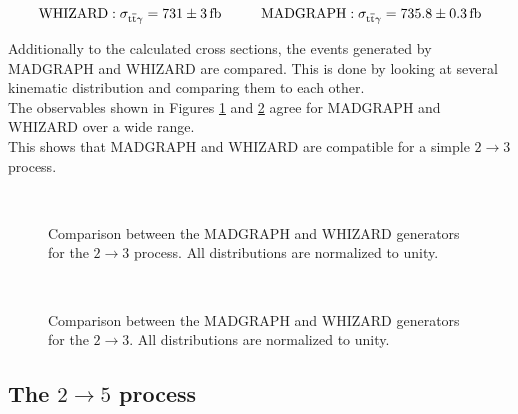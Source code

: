 \begin{equation}
\mathrm{WHIZARD: }\; \sigma_{\ttgamma} = \SI{731 \pm 3}{\femto \barn} \hspace{1.cm} \mathrm{MADGRAPH: }\;  \sigma_{\ttgamma} = \SI{735.8 \pm 0.3}{\femto \barn}
\label{eq_simu_2to3_cross}
\end{equation}

Additionally to the calculated cross sections, the events generated by MADGRAPH and WHIZARD are compared. This is done by looking  at several kinematic distribution and comparing them to each other. \\
The observables shown in Figures \ref{fig_simu_comp_2to3_1} and \ref{fig_simu_comp_2to3_2} agree for MADGRAPH and WHIZARD over a wide range.\\
This shows that MADGRAPH and WHIZARD are compatible for a simple $2 \to 3$ process.

\begin{figure}
\centering
  \\
  \caption{Comparison between the MADGRAPH and WHIZARD generators for the $2 \to 3$ process. All distributions are normalized to unity.}
  \label{fig_simu_comp_2to3_1}
\end{figure}

\begin{figure}
\centering
  \\
  \caption{Comparison between the MADGRAPH and WHIZARD generators for the $2 \to 3$. All distributions are normalized to unity.}
  \label{fig_simu_comp_2to3_2}
\end{figure}


\subsection{The $2 \to 5$ process}

